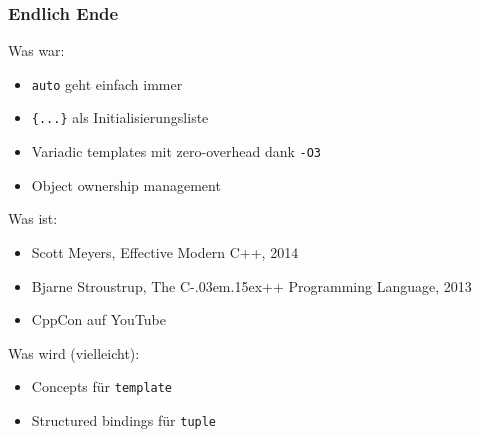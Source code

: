 \documentclass[t,ngerman,usepdftitle=false]{beamer}
\newcommand\Cpp{%
  C\kern-.03em\raise.15ex\hbox{++}%
  \spacefactor1000}
\begin{document}
\begin{frame}[fragile]
  \frametitle{Endlich Ende}
  
  Was war:
  \begin{itemize}
    \item \lstinline|auto| geht einfach immer
    \item \lstinline|{...}| als Initialisierungsliste
    \item Variadic templates mit zero-overhead dank \lstinline|-O3|
    \item Object ownership management
  \end{itemize}
  
  Was ist:
  \begin{itemize}
    \item Scott Meyers, Effective Modern C++, 2014
    \item Bjarne Stroustrup, The \Cpp{} Programming Language, 2013
    \item CppCon auf YouTube
  \end{itemize}
  
  Was wird (vielleicht):
  \begin{itemize}
    \item Concepts für \lstinline|template|
    \item Structured bindings für \lstinline|tuple|
  \end{itemize}
  
\end{frame}
\end{document}
